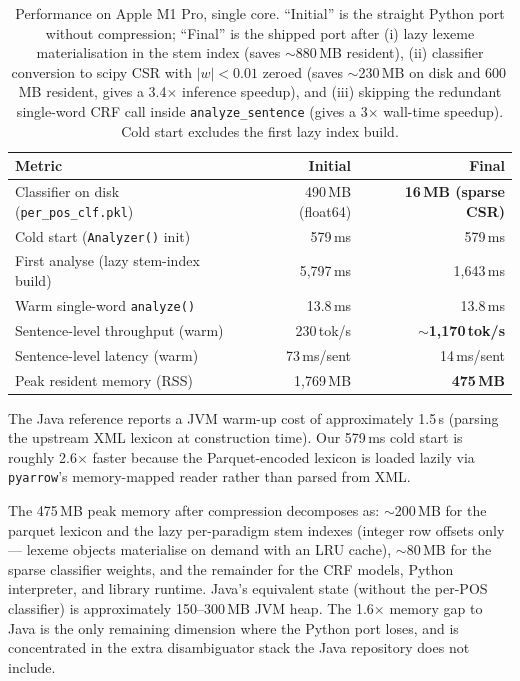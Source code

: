 \documentclass[11pt,a4paper]{article}
\begin{document}
\begin{table}[h]
\centering
\begin{tabular}{lrr}
\toprule
\textbf{Metric} & \textbf{Initial} & \textbf{Final} \\
\midrule
Classifier on disk (\texttt{per\_pos\_clf.pkl}) & 490\,MB (float64) & \textbf{16\,MB (sparse CSR)} \\
Cold start (\texttt{Analyzer()} init) & 579\,ms & 579\,ms \\
First analyse (lazy stem-index build) & 5{,}797\,ms & 1{,}643\,ms \\
Warm single-word \texttt{analyze()} & 13.8\,ms & 13.8\,ms \\
Sentence-level throughput (warm) & 230\,tok/s & \textbf{$\sim$1{,}170\,tok/s} \\
Sentence-level latency (warm) & 73\,ms/sent & 14\,ms/sent \\
Peak resident memory (RSS) & 1{,}769\,MB & \textbf{475\,MB} \\
\bottomrule
\end{tabular}
\caption{Performance on Apple M1 Pro, single core. ``Initial'' is the
straight Python port without compression; ``Final'' is the shipped port
after (i) lazy lexeme materialisation in the stem index (saves $\sim$880\,MB
resident), (ii) classifier conversion to scipy CSR with $|w|<0.01$
zeroed (saves $\sim$230\,MB on disk and 600\,MB resident, gives a 3.4$\times$
inference speedup), and (iii) skipping the redundant single-word CRF call
inside \texttt{analyze\_sentence} (gives a 3$\times$ wall-time speedup).
Cold start excludes the first lazy index build.}
\label{tab:perf}
\end{table}

The Java reference reports a JVM warm-up cost of approximately 1.5\,s
(parsing the upstream XML lexicon at construction time). Our 579\,ms cold
start is roughly 2.6$\times$ faster because the Parquet-encoded lexicon is
loaded lazily via \texttt{pyarrow}'s memory-mapped reader rather than parsed
from XML.

The 475\,MB peak memory after compression decomposes as:
$\sim$200\,MB for the parquet lexicon and the lazy per-paradigm stem indexes
(integer row offsets only --- lexeme objects materialise on demand with an
LRU cache), $\sim$80\,MB for the sparse classifier weights, and the
remainder for the CRF models, Python interpreter, and library runtime.
Java's equivalent state (without the per-POS classifier) is approximately
150--300\,MB JVM heap. The 1.6$\times$ memory gap to Java is the only
remaining dimension where the Python port loses, and is concentrated in the
extra disambiguator stack the Java repository does not include.
\end{document}
